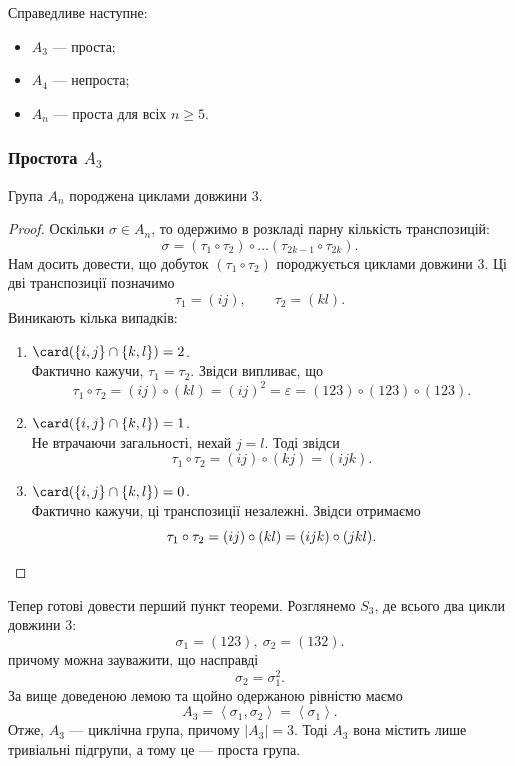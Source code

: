 \documentclass{math_library}
\begin{document}
\begin{theorem}
Справедливе наступне:
\begin{itemize}[nosep,wide=0pt]
\item $A_3$ --- проста;
\item $A_4$ --- непроста;
\item $A_n$ --- проста для всіх $n \geq 5$.
\end{itemize}
\end{theorem}

\subsubsection{Простота $A_3$}
\begin{lemma}
\label{A_n_is_generated_by_3_cycles}
Група $A_n$ породжена циклами довжини $3$.
\end{lemma}

\begin{proof}
Оскільки $\sigma \in A_n$, то одержимо в розкладі парну кількість транспозицій:
\[
\sigma = (\tau_1 \circ \tau_2) \circ \dots (\tau_{2k-1} \circ \tau_{2k}).
\]
Нам досить довести, що добуток $(\tau_1 \circ \tau_2)$ породжується циклами довжини $3$. Ці дві транспозиції позначимо
\[
\tau_1 = (ij), \qquad \tau_2 = (kl).
\]
Виникають кілька випадків:
\begin{enumerate}[nosep,wide=0pt,label={\arabic*)}]
\item $\card(\{i,j\} \cap \{k,l\}) = 2$. \\
Фактично кажучи, $\tau_1 = \tau_2$. Звідси випливає, що
\[ 
\tau_1 \circ \tau_2 = (ij) \circ (kl) = (ij)^2 = \varepsilon = (123) \circ (123) \circ (123).
\]
\item $\card(\{i,j\} \cap \{k,l\}) = 1$. \\
Не втрачаючи загальності, нехай $j = l$. Тоді звідси 
\[
\tau_1 \circ \tau_2 = (ij) \circ (kj) = (ijk).
\]
\item $\card(\{i,j\} \cap \{k,l\}) = 0$.\\
Фактично кажучи, ці транспозиції незалежні. Звідси отримаємо 
\[
\tau_1 \circ \tau_2 = (ij) \circ (kl) = (ijk) \circ (jkl). \qedhere
\]
\end{enumerate}
\end{proof}

Тепер готові довести перший пункт теореми. Розглянемо $S_3$, де всього два цикли довжини $3$:
\[
\sigma_1 = (123),\ \sigma_2 = (132).
\]
причому можна зауважити, що насправді 
\[
\sigma_2 = \sigma_1^2.
\]
За вище доведеною лемою та щойно одержаною рівністю маємо
\[
A_3 = \left< \sigma_1, \sigma_2 \right> = \left< \sigma_1 \right>.
\]
Отже, $A_3$ --- циклічна група, причому $|A_3| = 3$. Тоді $A_3$ вона містить лише тривіальні підгрупи, а тому це --- проста група.
\end{document}
